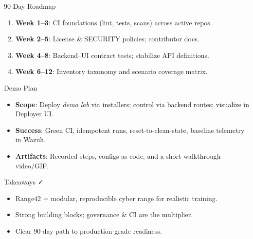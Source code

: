 \documentclass[aspectratio=169]{beamer}
\begin{document}
\begin{frame}{90-Day Roadmap \; \faRoad}
  \begin{enumerate}
    \item \textbf{Week 1–3}: CI foundations (lint, tests, scans) across active repos.
    \item \textbf{Week 2–5}: License \& SECURITY policies; contributor docs.
    \item \textbf{Week 4–8}: Backend–UI contract tests; stabilize API definitions.
    \item \textbf{Week 6–12}: Inventory taxonomy and scenario coverage matrix.
  \end{enumerate}
\end{frame}

\begin{frame}{Demo Plan \; \faPlay}
  \begin{itemize}
    \item \textbf{Scope}: Deploy \emph{demo lab} via installers; control via backend routes; visualize in Deployer UI.
    \item \textbf{Success}: Green CI, idempotent runs, reset-to-clean-state, baseline telemetry in Wazuh.
    \item \textbf{Artifacts}: Recorded steps, configs as code, and a short walkthrough video/GIF.
  \end{itemize}
\end{frame}

\begin{frame}{Takeaways \; \faCheck}
  \begin{itemize}
    \item Range42 = modular, reproducible cyber range for realistic training.
    \item Strong building blocks; \alert{governance \& CI} are the multiplier.
    \item Clear 90-day path to production-grade readiness.
  \end{itemize}
\end{frame}
\end{document}
